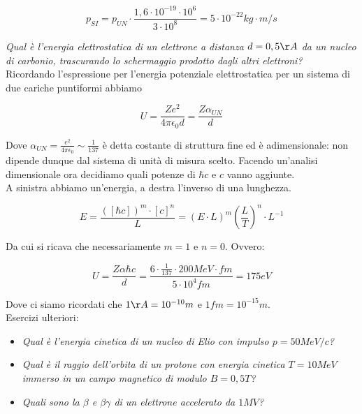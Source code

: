 \begin{equation}
p_{SI}=p_{UN}\cdot\frac{1,6\cdot10^{-19}\cdot10^6}{3\cdot10^8}=5\cdot10^{-22}kg\cdot m/s
\end{equation}

\emph{Qual è l'energia elettrostatica di un elettrone a distanza $d=0,5\AA$ da un nucleo di carbonio, trascurando lo schermaggio prodotto dagli altri elettroni?}\\

Ricordando l'espressione per l'energia potenziale elettrostatica per un sistema di due cariche puntiformi abbiamo

\begin{equation}
U=\frac{Ze^2}{4\pi\epsilon_0d}=\frac{Z\alpha_{UN}}{d}
\end{equation}

Dove $\alpha_{UN}=\frac{e^2}{4\pi\epsilon_0}\sim\frac{1}{137}$ è detta costante di struttura fine ed è adimensionale: non dipende dunque dal sistema di unità di misura scelto. Facendo un'analisi dimensionale ora decidiamo quali potenze di $\hbar c$ e $c$ vanno aggiunte.\\

A sinistra abbiamo un'energia, a destra l'inverso di una lunghezza.

\begin{equation}
E=\frac{([\hbar c])^m \cdot [c]^n}{L}=(E\cdot L)^m\left(\frac{L}{T}\right)^n\cdot L^{-1}
\end{equation}

Da cui si ricava che necessariamente $m=1$ e $n=0$. Ovvero:

\begin{equation}
U=\frac{Z\alpha\hbar c}{d}=\frac{6\cdot\frac{1}{137}\cdot200MeV\cdot fm}{5\cdot 10^4 fm}=175eV
\end{equation}

Dove ci siamo ricordati che $1\AA=10^{-10}m$ e $1 fm=10^{-15}m$.\\

Esercizi ulteriori:

\begin{itemize}
\item \emph{Qual è l'energia cinetica di un nucleo di Elio con impulso $p=50MeV/c$?}
\item \emph{Qual è il raggio dell'orbita di un protone con energia cinetica $T=10MeV$ immerso in un campo magnetico di modulo $B=0,5 T$?}
\item \emph{Quali sono la $\beta$ e $\beta\gamma$ di un elettrone accelerato da $1 MV$?}
\end{itemize}

